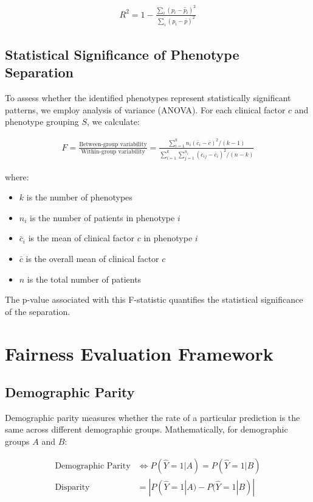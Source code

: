 \documentclass[12pt]{article}
\begin{document}
\begin{align}
R^2 = 1 - \frac{\sum_i (p_i - \hat{p}_i)^2}{\sum_i (p_i - \bar{p})^2}
\end{align}

\subsection{Statistical Significance of Phenotype Separation}

To assess whether the identified phenotypes represent statistically significant patterns, we employ analysis of variance (ANOVA). For each clinical factor $c$ and phenotype grouping $S$, we calculate:

\begin{align}
F = \frac{\text{Between-group variability}}{\text{Within-group variability}} = \frac{\sum_{i=1}^{k} n_i(\bar{c}_i - \bar{c})^2 / (k-1)}{\sum_{i=1}^{k}\sum_{j=1}^{n_i} (c_{ij} - \bar{c}_i)^2 / (n-k)}
\end{align}

where:
\begin{itemize}
    \item $k$ is the number of phenotypes
    \item $n_i$ is the number of patients in phenotype $i$
    \item $\bar{c}_i$ is the mean of clinical factor $c$ in phenotype $i$
    \item $\bar{c}$ is the overall mean of clinical factor $c$
    \item $n$ is the total number of patients
\end{itemize}

The p-value associated with this F-statistic quantifies the statistical significance of the separation.

\section{Fairness Evaluation Framework}

\subsection{Demographic Parity}

Demographic parity measures whether the rate of a particular prediction is the same across different demographic groups. Mathematically, for demographic groups $A$ and $B$:

\begin{align}
\text{Demographic Parity} &\iff P(\hat{Y}=1|A) = P(\hat{Y}=1|B)\\
\text{Disparity} &= |P(\hat{Y}=1|A) - P(\hat{Y}=1|B)|
\end{align}
\end{document}
